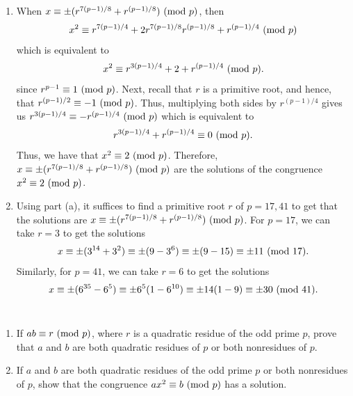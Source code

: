 \begin{solution}
    \begin{enumerate}
        \item When $x\equiv \pm(r^{7(p-1)/8} + r^{(p-1)/8}) \ (\mathrm{mod}\ p)$, then
        $$x^2 \equiv r^{7(p-1)/4} + 2r^{7(p-1)/8}r^{(p-1)/8} + r^{(p-1)/4} \ (\mathrm{mod}\ p)$$
        which is equivalent to
        $$x^2 \equiv r^{3(p-1)/4} + 2 + r^{(p-1)/4} \ (\mathrm{mod}\ p).$$
        since $r^{p-1} \equiv 1 \ (\mathrm{mod}\ p)$. Next, recall that $r$ is a primitive root, and hence, that $r^{(p-1)/2} \equiv -1 \ (\mathrm{mod}\ p)$. Thus, multiplying both sides by $r^{(p-1)/4}$ gives us $r^{3(p-1)/4} \equiv -r^{(p-1)/4} \ (\mathrm{mod}\ p)$ which is equivalent to
        $$r^{3(p-1)/4} + r^{(p-1)/4} \equiv 0 \ (\mathrm{mod}\ p).$$
        Thus, we have that $x^2 \equiv 2 \ (\mathrm{mod}\ p)$. Therefore, $x\equiv \pm(r^{7(p-1)/8} + r^{(p-1)/8}) \ (\mathrm{mod}\ p)$ are the solutions of the congruence $x^2 \equiv 2 \ (\mathrm{mod}\ p)$.
        \item Using part (a), it suffices to find a primitive root $r$ of $p = 17,41$ to get that the solutions are $x \equiv \pm(r^{7(p-1)/8} + r^{(p-1)/8}) \ (\mathrm{mod}\ p)$. For $p = 17$, we can take $r = 3$ to get the solutions
        $$x \equiv \pm (3^{14} + 3^2) \equiv \pm (9 - 3^6) \equiv \pm (9 - 15) \equiv \pm 11 \ (\mathrm{mod}\ 17).$$
        Similarly, for $p = 41$, we can take $r = 6$ to get the solutions
        $$x \equiv \pm (6^{35} - 6^5) \equiv \pm 6^5(1 - 6^{10}) \equiv \pm 14(1 - 9) \equiv \pm 30 \ (\mathrm{mod}\ 41).$$\\
    \end{enumerate}
\end{solution}

\begin{exercise}
    \begin{enumerate}
        \item If $ab \equiv r \ (\mathrm{mod}\ p)$, where $r$ is a quadratic residue of the odd prime $p$, prove that $a$ and $b$ are both quadratic residues of $p$ or both nonresidues of $p$.
        \item If $a$ and $b$ are both quadratic residues of the odd prime $p$ or both nonresidues of $p$, show that the congruence $ax^2 \equiv b \ (\mathrm{mod}\ p)$ has a solution.  \\
    \end{enumerate}
\end{exercise}

